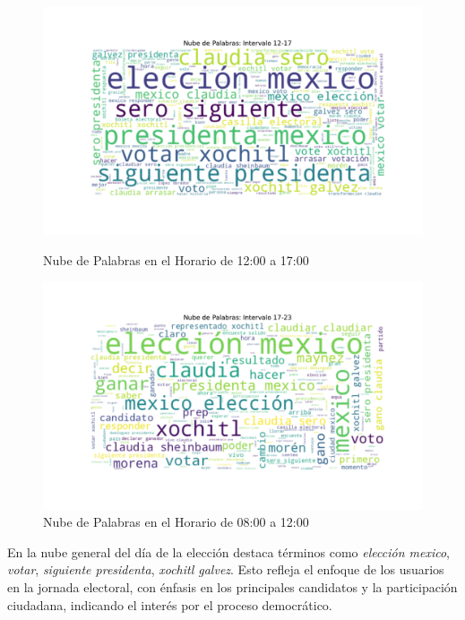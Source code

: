 \documentclass[10pt, a4paper]{article}
\begin{document}
	
	\begin{figure}[h!]
		\centering
		\begin{minipage}{0.49\textwidth} %
			\includegraphics[width=\linewidth]{nube_intervalo_12-17.pdf} 
			\vspace{-10mm}
			\caption{Nube de Palabras en el Horario de 12:00 a 17:00}
			\label{fig:nubeIntervalo1217}
		\end{minipage}
		\hfill %
		\begin{minipage}{0.49\textwidth}
			\includegraphics[width=\linewidth]{nube_intervalo_17-23.pdf}
			\vspace{-10mm}
			\caption{Nube de Palabras en el Horario de 08:00 a 12:00}
			\label{fig:nubeIntervalo1723}
		\end{minipage}
	\end{figure}

	En la nube general del día de la elección destaca términos como \textit{elección mexico}, \textit{votar}, \textit{siguiente presidenta}, \textit{xochitl galvez}. Esto refleja el enfoque de los usuarios en la jornada electoral, con énfasis en los principales candidatos y la participación ciudadana, indicando el interés por el proceso democrático.
	
\end{document}
